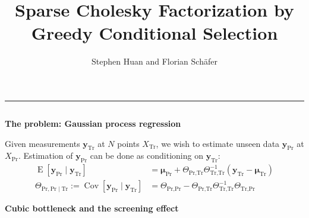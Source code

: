 \documentclass{beamer}                             %
\title[]{\Huge Sparse Cholesky Factorization by \\
Greedy Conditional Selection}
\subtitle{}
\author[Huan]{\LARGE Stephen Huan and Florian Sch{\"a}fer}
\date[]{}
\newcommand{\blocktitle}[1]{{\Large \textbf{#1}}}
\renewcommand{\vec}[1]{\bm{#1}}
\DeclareMathOperator{\E}{E}
\DeclareMathOperator{\Cov}{Cov}
\begin{document}
\begin{frame}[t]
\titlepage



\vspace{-8cm}

\begin{center}
  \textcolor{darksilver}{\rule{\textwidth}{2mm}}
\end{center}

\begin{columns}[T]


\begin{column}{0.30\textwidth}
  \begin{tcolorbox}
    \blocktitle{The problem: Gaussian process regression}

    Given measurements \( \vec{y}_\text{Tr} \) at \( N \) points \(
    X_\text{Tr} \), we wish to estimate unseen data \( \vec{y}_\text{Pr}
    \) at \( X_\text{Pr} \). Estimation of \( \vec{y}_\text{Pr} \) can
    be done as conditioning on \( \vec{y}_\text{Tr} \):
    \begin{align*}
      \E[\vec{y}_\text{Pr} \mid \vec{y}_\text{Tr}] &=
        \vec{\mu}_\text{Pr} +
        \Theta_{\text{Pr}, \text{Tr}} \Theta_{\text{Tr}, \text{Tr}}^{-1}
        (\vec{y}_\text{Tr} - \vec{\mu}_\text{Tr}) \\
      \Theta_{\text{Pr}, \text{Pr} \mid \text{Tr}} :=
      \Cov[\vec{y}_\text{Pr} \mid \vec{y}_\text{Tr}] &=
        \Theta_{\text{Pr}, \text{Pr}} -
        \Theta_{\text{Pr}, \text{Tr}} \Theta_{\text{Tr}, \text{Tr}}^{-1}
        \Theta_{\text{Tr}, \text{Pr}}
    \end{align*}
  \end{tcolorbox}

  \begin{tcolorbox}
    \blocktitle{Cubic bottleneck and the screening effect}


\end{tcolorbox}
\end{column}
\end{columns}
\end{frame}
\end{document}
